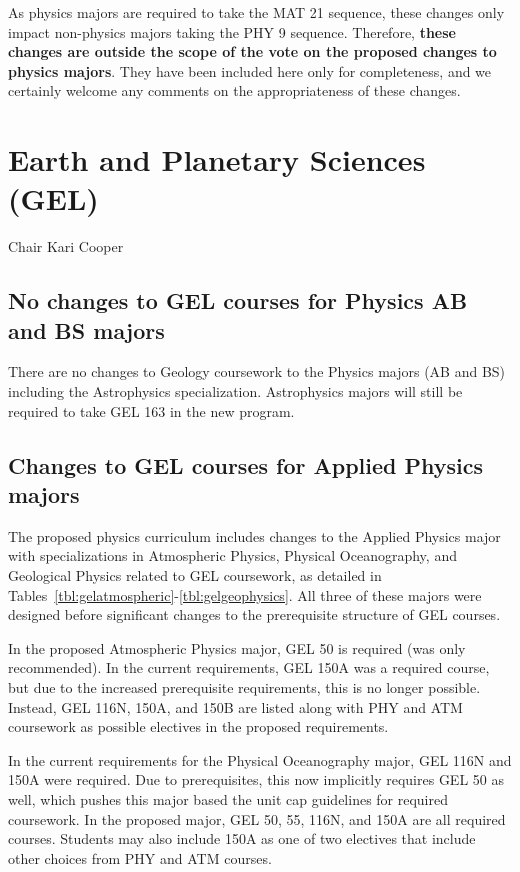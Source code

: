 \documentclass[12pt]{article}
\begin{document}
As physics majors are required to take the MAT 21 sequence, these
changes only impact non-physics majors taking the PHY 9 sequence.
Therefore, {\bf these changes are outside the scope of the vote on the
  proposed changes to physics majors}.  They have been included here
only for completeness, and we certainly welcome any comments on the
appropriateness of these changes.

\newpage
\section{Earth and Planetary Sciences (GEL)}
Chair Kari Cooper

\subsection{No changes to GEL courses for Physics AB and BS majors}

There are no changes to Geology coursework to the Physics majors (AB
and BS) including the Astrophysics specialization.  Astrophysics
majors will still be required to take GEL 163 in the new program.

\subsection{Changes to GEL courses for Applied Physics majors}

The proposed physics curriculum includes changes to the Applied
Physics major with specializations in Atmospheric Physics, Physical
Oceanography, and Geological Physics related to GEL coursework, as
detailed in Tables~\ref{tbl:gelatmospheric}-\ref{tbl:gelgeophysics}.
All three of these majors were designed before significant changes to
the prerequisite structure of GEL courses.

In the proposed Atmospheric Physics major, GEL 50 is required (was
only recommended).  In the current requirements, GEL 150A was a
required course, but due to the increased prerequisite requirements,
this is no longer possible.  Instead, GEL 116N, 150A, and 150B are
listed along with PHY and ATM coursework as possible electives in the
proposed requirements.

In the current requirements for the Physical Oceanography major, GEL
116N and 150A were required.  Due to prerequisites, this now
implicitly requires GEL 50 as well, which pushes this major based the
unit cap guidelines for required coursework.  In the proposed major,
GEL 50, 55, 116N, and 150A are all required courses.  Students may
also include 150A as one of two electives that include other choices
from PHY and ATM courses.
\end{document}
